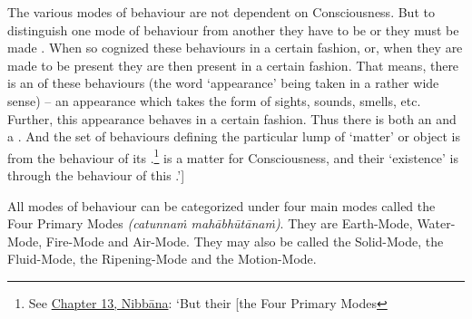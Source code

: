 The various modes of behaviour are not dependent on Consciousness. But to distinguish one mode of behaviour from another they have to be  or they must be made . When so cognized these behaviours  in a certain fashion, or, when they are made to be present they are then present in a certain fashion. That means, there is an  of these behaviours (the word `appearance' being taken in a rather wide sense) -- an appearance which takes the form of sights, sounds, smells, etc. Further, this appearance behaves in a certain fashion. Thus there is both an  and a . And the set of behaviours defining the particular lump of `matter' or object is  from the behaviour of its .\footnote{See \href{ch-13-nibbana.xml\#the-four-primary}{Chapter 13, Nibbāna}: `But their {[}the Four Primary Modes}  is a matter for Consciousness, and their `existence' is  through the behaviour of this .'{]}

All modes of behaviour can be categorized under four main modes called the Four Primary Modes \emph{(catunnaṁ mahābhūtānaṁ)}. They are Earth-Mode, Water-Mode, Fire-Mode and Air-Mode. They may also be called the Solid-Mode, the Fluid-Mode, the Ripening-Mode and the Motion-Mode.

